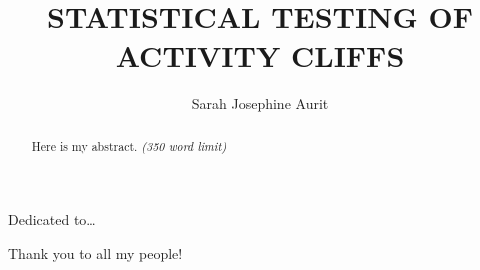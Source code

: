 \documentclass[print]{nuthesis}
\begin{document}
\frontmatter
\title{STATISTICAL TESTING OF ACTIVITY CLIFFS}
\author{Sarah Josephine Aurit}
\maketitle


\begin{abstract}
    Here is my abstract. \emph{(350 word limit)}
\end{abstract}

\begin{copyrightpage}
\end{copyrightpage}

\begin{dedication}
Dedicated to\ldots{}
\end{dedication}

\begin{acknowledgments}
Thank you to all my people!
\end{acknowledgments}


\tableofcontents

\listoffigures
\listoftables

\mainmatter
\end{document}
